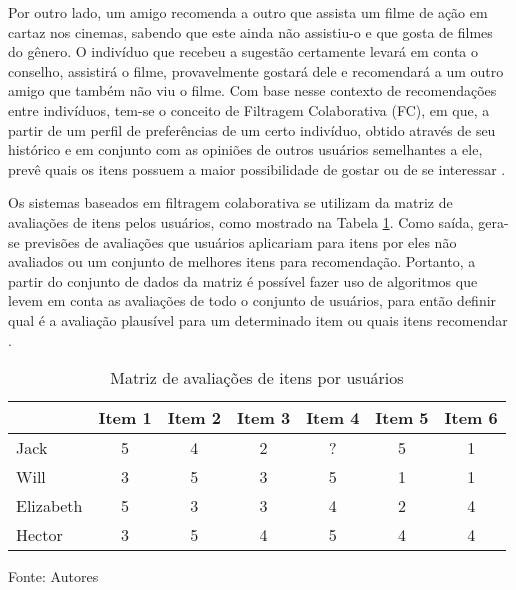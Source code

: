     Por outro lado, um amigo recomenda a outro que assista um filme de ação em cartaz nos cinemas, sabendo que este ainda não assistiu-o e que gosta de filmes do gênero. O indivíduo que recebeu a sugestão certamente levará em conta o conselho, assistirá o filme, provavelmente gostará dele e recomendará a um outro amigo que também não viu o filme.    
    Com base nesse contexto de recomendações entre indivíduos, tem-se o conceito de Filtragem Colaborativa (FC), em que, a partir de um perfil de preferências de um certo indivíduo, obtido através de seu histórico e em conjunto com as opiniões de outros usuários semelhantes a ele, prevê quais os itens possuem a maior possibilidade de gostar ou de se interessar \cite{Jannach2010}.



    
    Os sistemas baseados em filtragem colaborativa se utilizam da matriz de avaliações de itens pelos usuários, como mostrado na Tabela \ref{tab:matriz-av-item-user}. Como saída, gera-se previsões de avaliações que usuários aplicariam para itens por eles não avaliados ou um conjunto de melhores itens para recomendação. Portanto, a partir do conjunto de dados da matriz é possível fazer uso de algoritmos que levem em conta as avaliações de todo o conjunto de usuários, para então definir qual é a avaliação plausível para um determinado item ou quais itens recomendar \cite{Bobadilla_2013}.
    
    \begin{table}[htb]
        
        \caption{Matriz de avaliações de itens por usuários}
        \label{tab:matriz-av-item-user}
        \begin{tabular}{@{}lcccccc@{}}
        \toprule
                  & Item 1 & Item 2 & Item 3 & Item 4 & Item 5 & Item 6 \\ \midrule
        Jack      & 5      & 4      & 2      & ?      & 5      & 1      \\
        Will      & 3      & 5      & 3      & 5      & 1      & 1      \\
        Elizabeth & 5      & 3      & 3      & 4      & 2      & 4      \\
        Hector    & 3      & 5      & 4      & 5      & 4      & 4      \\ \bottomrule
        \end{tabular}
        
        \footnotesize{Fonte: Autores}
    \end{table}
    

